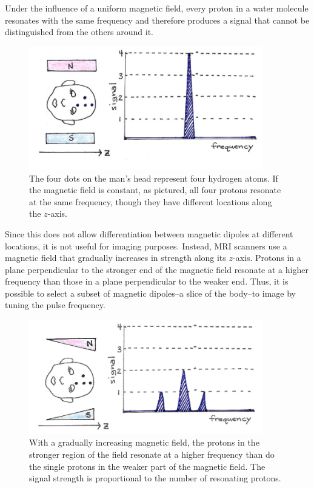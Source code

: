 Under the influence of a uniform magnetic field, every proton in a water molecule resonates with the same frequency and therefore produces a signal that cannot be distinguished from the others around it.  
\begin{figure}[!htb]
	\centering
	\includegraphics[width=4.0in]{./figures/Topic10/Fig10-15.png}
	\caption{The four dots on the man’s head represent four hydrogen atoms.  If the magnetic field is constant, as pictured, all four protons resonate at the same frequency, though they have different locations along the $z$-axis.}
	\label{Fig10-15}
\end{figure}
Since this does not allow differentiation between magnetic dipoles at different locations, it is not useful for imaging purposes.  Instead, MRI scanners use a magnetic field that gradually increases in strength along its $z$-axis.  Protons in a plane perpendicular to the stronger end of the magnetic field resonate at a higher frequency than those in a plane perpendicular to the weaker end.  Thus, it is possible to select a subset of magnetic dipoles--a slice of the body--to image by tuning the pulse frequency.
\begin{figure}[!htb]
	\centering
	\includegraphics[width=4.0in]{./figures/Topic10/Fig10-16.png}
	\caption{With a gradually increasing magnetic field, the protons in the stronger region of the field resonate at a higher frequency than do the single protons in the weaker part of the magnetic field.  The signal strength is proportional to the number of resonating protons.}
	\label{Fig10-16}
\end{figure}

